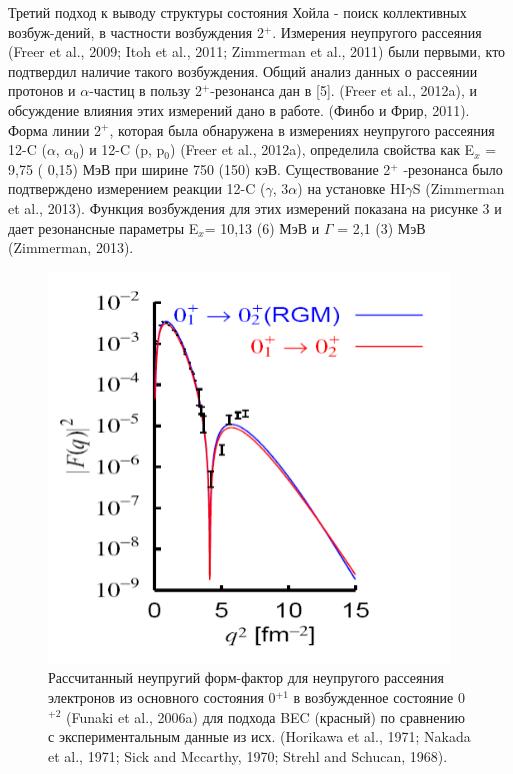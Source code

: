 \documentclass[fontsize=14pt]{scrarticle}
\begin{document}
Третий подход к выводу структуры состояния Хойла - поиск коллективных возбуж-дений, в частности возбуждения 2$^{+}$. Измерения неупругого рассеяния (Freer et al., 2009; Itoh et al., 2011; Zimmerman et al., 2011) были первыми, кто подтвердил наличие такого возбуждения. Общий анализ данных о рассеянии протонов и $\alpha$-частиц в пользу 2$^{+}$-резонанса дан в [5]. (Freer et al., 2012a), и обсуждение влияния этих измерений дано в работе. (Финбо и Фрир, 2011). Форма линии 2$^{+}$, которая была обнаружена в измерениях неупругого рассеяния 12-C ($\alpha$, $\alpha_{0}$) и 12-C (p, p$_{0}$) (Freer et al., 2012a), определила свойства как E$_{x}$ = 9,75 ( 0,15) МэВ при ширине 750 (150) кэВ. Существование 2$^{+}$ -резонанса было подтверждено измерением реакции 12-C ($\gamma$, 3$\alpha$) на установке HI$\gamma$S (Zimmerman et al., 2013). Функция возбуждения для этих измерений показана на рисунке 3 и дает резонансные параметры E$_{x}$= 10,13 (6) МэВ и $\Gamma$ = 2,1 (3) МэВ (Zimmerman, 2013).

\begin{figure}[!ht]
\centerline{\includegraphics[scale=.5]{picture3.png}}
\caption{Рассчитанный неупругий форм-фактор для неупругого рассеяния электронов из основного состояния 0$^{+1}$ в возбужденное состояние 0$^{+2}$ (Funaki et al., 2006a) для подхода BEC (красный) по сравнению с экспериментальным данные из исх. (Horikawa et al., 1971; Nakada et al., 1971; Sick and Mccarthy, 1970; Strehl and Schucan, 1968).}
\label{fig1}
\end{figure}
\end{document}
